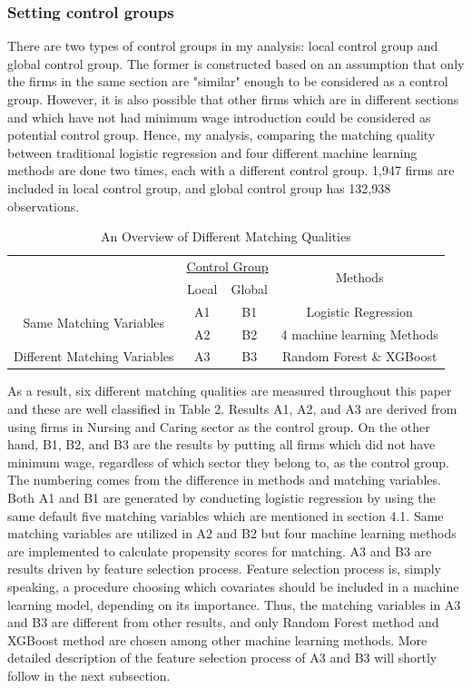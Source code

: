 \documentclass[11pt,a4paper,oneside]{article}
\begin{document}
\subsubsection{Setting control groups}
There are two types of control groups in my analysis: local control group and global control group. The former is constructed based on an assumption that only the firms in the same section are "similar" enough to be considered as a control group. However, it is also possible that other firms which are in different sections and which have not had minimum wage introduction could be considered as potential control group. Hence, my analysis, comparing the matching quality between traditional logistic regression and four different machine learning methods are done two times, each with a different control group. 1,947 firms are included in local control group, and global control group has 132,938 observations. 
\begin{table}[t!]
	\centering
	\caption{An Overview of Different Matching Qualities}
	\def\arraystretch{0.7}
	\begin{tabular}{*4c} 
		\toprule {} & \multicolumn{2}{c}{\underline{Control Group}} & \multirow{2}{*}{Methods}\\
		{} & Local & Global & \multirow{2}{*}{}\\
		\midrule \multirow{2}{*}{Same Matching Variables} & A1 & B1 & Logistic Regression\\
		\multirow{2}{*}{} & A2 & B2 & 4 machine learning Methods\\
		Different Matching Variables & A3 & B3 & Random Forest \& XGBoost		
	\end{tabular}
	\label{table:2}
\end{table}

\par
As a result, six different matching qualities are measured throughout this paper and these are well classified in Table 2. Results A1, A2, and A3 are derived from using firms in Nursing and Caring sector as the control group. On the other hand, B1, B2, and B3 are the results by putting all firms which did not have minimum wage, regardless of which sector they belong to, as the control group. The numbering comes from the difference in methods and matching variables. Both A1 and B1 are generated by conducting logistic regression by using the same default five matching variables which are mentioned in section 4.1. Same matching variables are utilized in A2 and B2 but four machine learning methods are implemented to calculate propensity scores for matching. A3 and B3 are results driven by feature selection process. Feature selection process is, simply speaking, a procedure choosing which covariates should be included in a machine learning model, depending on its importance. Thus, the matching variables in A3 and B3 are different from other results, and only Random Forest method and XGBoost method are chosen among other machine learning methods. More detailed description of the feature selection process of A3 and B3 will shortly follow in the next subsection.
\end{document}
